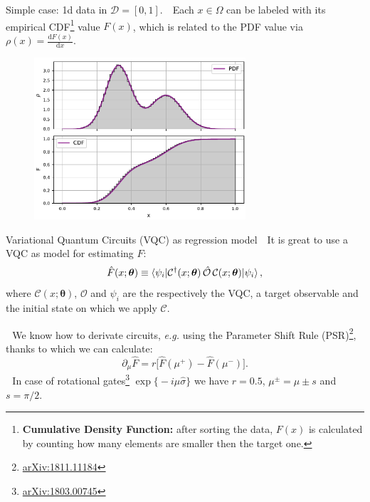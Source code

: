 \documentclass[8pt, xcolor={svgnames}, hyperref={colorlinks, linkcolor=black, citecolor=amethyst, urlcolor=amethyst}]{beamer}
\begin{document}
\begin{frame}{Simple case: 1d data in $\mathcal{D} = [0,1]$.}
\large
\faArrowCircleRight\,\, Each  $x\in \Omega$ can be labeled with its 
empirical CDF\footnote{\textbf{Cumulative Density Function:} after sorting the data,
$F(x)$ is calculated by counting how many elements are smaller then the target one.} value $F(x)$,
which is related to the PDF value via $\rho(x) = \frac{\text{d}F(x)}{\text{d} x}$. 

\begin{figure}
    \includegraphics[width=0.7\textwidth]{figures/pdf_cdf.pdf}
\end{figure}
\end{frame}


\begin{frame}[fragile]{Variational Quantum Circuits (VQC) as regression model}
\large
\faArrowCircleRight\,\, It is great to use a VQC as model for estimating $F$:
\pause
\begin{equation}
    \hat{F}(x; \bm{\theta}) \equiv 
    \braket{\psi_i | \mathcal{C}^{\dagger}(x;\bm{\theta})\,  \hat{\mathcal{O}} \, 
    \mathcal{C}(x;\bm{\theta}) | \psi_i},
    \label{eq:estimated_y}
\end{equation}
where $\mathcal{C}(x; \bm{\theta})$, $\mathcal{O}$ and $\psi_i$ are the respectively the 
VQC, a target observable and the initial state on which we apply $\mathcal{C}$.

\pause
\faArrowCircleRight\,\, We know how to derivate circuits, \textit{e.g.} using the
Parameter Shift Rule (PSR)\footnote<3->{\href{https://arxiv.org/abs/1811.11184}{arXiv:1811.11184}}, thanks to which we can 
calculate:
\begin{equation}
\partial_{\mu}\hat{F} = r \bigl[\hat{F}(\mu^+) - \hat{F}(\mu^-) \bigr].
\label{eq:psr}
\end{equation}  
\pause
\faArrowCircleRight\,\, In case of rotational 
gates\footnote<4->{\href{https://arxiv.org/abs/1803.00745}{arXiv:1803.00745}} 
 $\exp{\bigl\{-i\mu \hat{\sigma}\bigr\} }$ 
we have $r=0.5$, $\mu^{\pm} = \mu \pm s$ and $s=\pi/2$. 
\end{frame}
\end{document}
